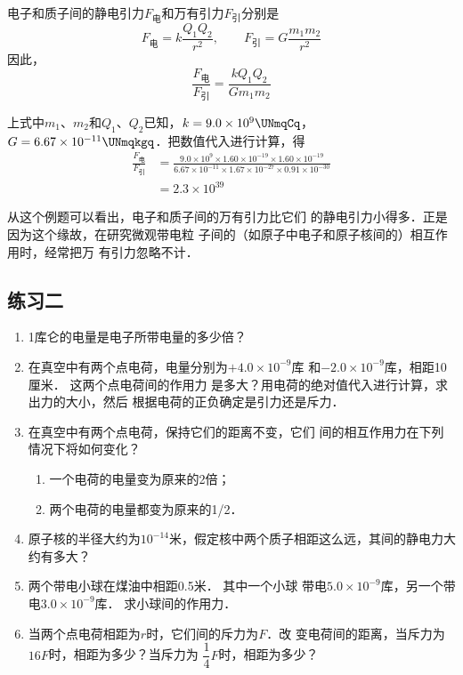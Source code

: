     
\begin{solution}
电子和质子间的静电引力$F_{\text{电}}$和万有引力$F_{\text{引}}$分别是
\[F_{\text{电}} =k\frac{Q_1Q_2}{r^2} ,\qquad   F_{\text{引}}=G\frac{m_1m_2}{r^2} \]
因此，
\[\frac{F_{\text{电}}}{F_{\text{引}}}=\frac{kQ_1Q_2}{Gm_1m_2} \]

上式中$m_1$、$m_2$和$Q_1$、$Q_2$已知，$k=9.0\times 10^9 \UNmqCq$，
$G=6.67\times10^{-11} \UNmqkgq $．把数值代入进行计算，得
\[\begin{split}
    \frac{F_{\text{电}}}{F_{\text{引}}}&=\frac{9.0\times 10^9\times1.60\times10^{-19}\times1.60\times10^{-19}}{6.67\times10^{-11}\times 1.67\times10^{-27}\times 0.91\times10^{-30}}\\
    &=2.3\times 10^{39}
\end{split}\]
\end{solution}


从这个例题可以看出，电子和质子间的万有引力比它们
的静电引力小得多．正是因为这个缘故，在研究微观带电粒
子间的（如原子中电子和原子核间的）相互作用时，经常把万
有引力忽略不计．



\subsection*{练习二}

\begin{enumerate}
    \item 1库仑的电量是电子所带电量的多少倍？
    \item 在真空中有两个点电荷，电量分别为$+4.0\times10^{-9}$库
和$-2.0\times10^{-9}$库，相距10厘米．
这两个点电荷间的作用力
是多大？用电荷的绝对值代入进行计算，求出力的大小，然后
根据电荷的正负确定是引力还是斥力．
\item 在真空中有两个点电荷，保持它们的距离不变，它们
间的相互作用力在下列情况下将如何变化？
\begin{enumerate}
    \item 一个电荷的电量变为原来的2倍；
    \item 两个电荷的电量都变为原来的1/2．
\end{enumerate}
\item 原子核的半径大约为$10^{-14}$米，假定核中两个质子相距这么远，其间的静电力大约有多大？
\item 两个带电小球在煤油中相距0.5米．
其中一个小球
带电$5.0\times10^{-9}$库，另一个带电$3.0\times10^{-9}$库．
求小球间的作用力．
\item 当两个点电荷相距为$r$时，它们间的斥力为$F$．改
变电荷间的距离，当斥力为$16F$时，相距为多少？当斥力为
$\dfrac{1}{4}F$时，相距为多少？
\end{enumerate}


